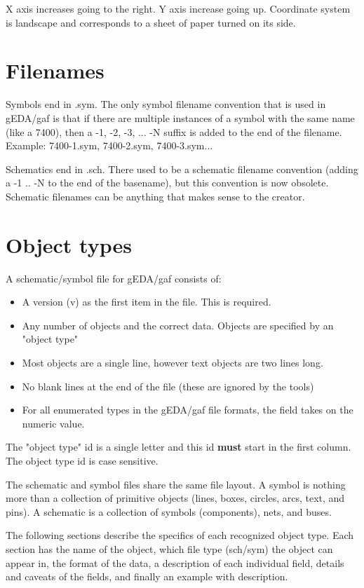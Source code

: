 \documentclass{article}
\begin{document}
X axis increases going to the right.  Y axis increase going up.
Coordinate system is landscape and corresponds to a sheet of paper turned
on its side.


\section{Filenames}

Symbols end in .sym.  The only symbol filename convention that is used in
gEDA/gaf is that if there are multiple instances of a symbol with the
same name (like a 7400), then a -1, -2, -3, ... -N suffix is added to
the end of the filename.  Example: 7400-1.sym, 7400-2.sym, 7400-3.sym...

Schematics end in .sch.  There used to be a schematic filename convention
(adding a -1 .. -N to the end of the basename), but this convention is now
obsolete.  Schematic filenames can be anything that makes sense to the 
creator.

\section{Object types}

A schematic/symbol file for gEDA/gaf consists of:

\begin{itemize}
 \item A version (v) as the first item in the file.  This is required.
 \item Any number of objects and the correct data.  Objects are specified 
       by an "object type"
 \item Most objects are a single line, however text objects are two lines long.
 \item No blank lines at the end of the file (these are ignored by the tools)
 \item For all enumerated types in the gEDA/gaf file formats, the field takes
       on the numeric value.
\end{itemize}

The "object type" id is a single letter and this id {\bf must} start in the 
first column.  The object type id is case sensitive.

The schematic and symbol files share the same file layout.  A symbol
is nothing more than a collection of primitive objects (lines, boxes,
circles, arcs, text, and pins).  A schematic is a collection of symbols
(components), nets, and buses.

The following sections describe the specifics of each recognized object 
type.  Each section has the name of the object, which file type (sch/sym)
the object can appear in, the format of the data, a description of
each individual field, details and caveats of the fields, and finally
an example with description.
\end{document}
